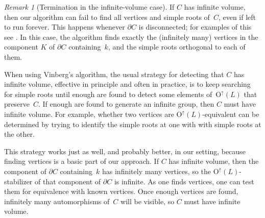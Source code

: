 \documentclass[12pt]{amsart}
\def\O{\mathrm{O}}
\def\Oup{\O^{\uparrow}}
\numberwithin{theorem}{section}
\numberwithin{equation}{section}
\numberwithin{figure}{section}
\theoremstyle{remark}
\newtheorem{remark}[theorem]{Remark}
\begin{document}
\begin{remark}[Termination in the infinite-volume case]
    \label{RkInfiniteVolumeTermination}
    If $C$ has infinite volume, then 
    our algorithm can fail to find all vertices and simple roots
    of~$C$,
    even if left to run forever.  This
    happens whenever $\partial C$ is disconnected; for examples
    of this see \cite[III]{NikulinRank3}.    In this case, the algorithm finds exactly
    the (infinitely many)
    vertices in the component $K$ of $\partial C$ containing~$k$,
    and the simple roots orthogonal to each of them.  

    When using Vinberg's algorithm,
    the usual strategy for detecting that $C$ has infinite volume,
     effective in principle and often 
     in practice, is to keep searching for simple
    roots until enough are found to detect some
    elements of~$\Oup(L)$
    that preserve~$C$.  If enough are found to
    generate an infinite group, then $C$ must
    have infinite volume.   For example, whether two vertices
    are $\Oup(L)$-equivalent
    can be determined by trying to identify the simple roots at one
    with with simple roots at the other.  

    This strategy works just as well, and probably better, in our setting,
 because finding vertices is a basic part of our approach.
    If $C$ has infinite volume, then the component of $\partial C$
    containing~$k$ has infinitely many vertices, so the $\Oup(L)$-stabilizer
    of that component of $\partial C$ is infinite.  As one finds vertices,
    one can test them for equivalence with known vertices.  Once enough
    vertices are found, infinitely many automorphisms of~$C$ 
    will be visible, so $C$ must have
    infinite volume.
\end{remark}
\end{document}
